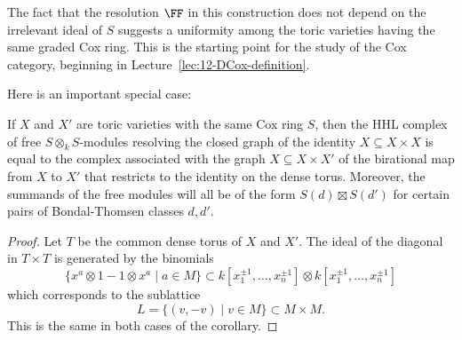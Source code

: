 \documentclass{amsart}
\begin{document}

The fact that the resolution $\FF$ in this construction does not depend on the irrelevant ideal of $S$
suggests a uniformity among the toric varieties having the same graded Cox ring. This
is the starting point for the study of the Cox category, beginning in Lecture~\ref{lec:12-DCox-definition}.

Here is an important special case: 

\begin{cor}\label{cor:diagonalUniform}
If $X$ and $X'$ are toric varieties with the same Cox ring $S$, then the HHL complex of free $S\otimes_k S$-modules resolving the closed graph of the identity $X\subseteq X\times X$ is equal to the complex associated with the 
graph $X\subseteq X\times X'$ of the birational map from $X$ to $X'$ that restricts to the identity on the dense torus.
Moreover, the summands of the free modules will all be of the form $S(d)\boxtimes S(d')$ for certain pairs of Bondal-Thomsen classes $d,d'$. 
 \end{cor}
\begin{proof}
Let $T$ be the common dense torus of $X$ and $X'$. The ideal of the diagonal in $T\times T$ is
generated by the binomials 
$$
\{x^{a}\otimes 1-1\otimes x^{a}  \mid a\in M\} \subset k[x_{1}^{\pm 1}, \dots, x_{n}^{\pm 1}]
\otimes k[x_{1}^{\pm 1}, \dots, x_{n}^{\pm 1}]
$$
which corresponds to the sublattice 
$$
L = \{(v,-v)\mid v\in M\}\subset M\times M.
$$
 This is
the same in both cases of the corollary.
\end{proof}
\end{document}
